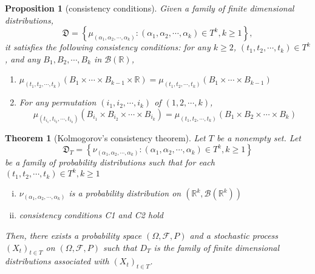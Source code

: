 \documentclass{report}
\newtheorem{proposition}{Proposition}[section]
\newtheorem{theorem}{Theorem}[section]
\theoremstyle{nonumberplain}
\begin{document}
\begin{proposition}[consistency conditions]
	Given a family of finite dimensional distributions,
	$$
	\mathfrak{D}=\left\{\mu_{\left(\alpha_{1}, \alpha_{2}, \cdots, \alpha_{k}\right)}:\left(\alpha_{1}, \alpha_{2}, \cdots, \alpha_{k}\right) \in T^{k}, k\ge1 \right\},
	$$
	it satisfies the following consistency conditions: for any $k\ge2$, $\left(t_{1}, t_{2}, \cdots, t_{k}\right) \in T^k$, and any $B_{1}, B_{2}, \cdots, B_{k}$ in $\mathcal{B}(\mathbb{R})$,
	\begin{enumerate}
		\item[(C1)] $\mu_{\left(t_{1}, t_{2}, \cdots, t_{k}\right)}\left(B_{1} \times \cdots \times B_{k-1} \times \mathbb{R}\right)=\mu_{\left(t_{1}, t_{2}, \cdots, t_{k}\right)}\left(B_{1} \times \cdots \times B_{k-1}\right)$
		\item[(C2)] For any permutation $\left(i_{1}, i_{2}, \cdots, i_{k}\right)$ of $(1,2, \cdots, k)$,
		\[
		\mu_{\left(t_{i_{1}}, t_{i_{2}}, \cdots, t_{i_{k}}\right)}\left(B_{i_{1}} \times B_{i_{2}} \times \cdots \times B_{i_{k}}\right)=\mu_{\left(t_{1}, t_{2}, \cdots, t_{k}\right)}\left(B_{1} \times B_{2} \times \cdots \times B_{k}\right)
		\]
	\end{enumerate}
\end{proposition}

\begin{theorem}[Kolmogorov's consistency theorem]
	Let $T$ be a nonempty set. Let 
	$$
	\mathfrak{D}_{T} =\left\{\nu_{\left(\alpha_{1}, \alpha_{2}, \cdots, \alpha_{k}\right)}:\left(\alpha_{1}, \alpha_{2}, \cdots, \alpha_{k}\right) \in T^{k}, k\ge1 \right\}
	$$
	be a family of probability distributions such that for each $\left(t_{1}, t_{2}, \cdots, t_{k}\right) \in T^k,k\ge1$
	\begin{enumerate}[(i)]
		\item $\nu_{\left(\alpha_{1}, \alpha_{2}, \cdots, \alpha_{k}\right)}$ is a probability distribution on $\left(\mathbb{R}^{k}, \mathcal{B}\left(\mathbb{R}^{k}\right)\right)$
		\item consistency conditions C1 and C2 hold
	\end{enumerate}
	Then, there exists a probability space $(\Omega, \mathcal{F}, P)$ and a stochastic process $(X_t)_{t\in T}$ on $(\Omega, \mathcal{F}, P)$ such that $D_{T}$ is the family of finite dimensional distributions associated with $(X_t)_{t\in T}$.
\end{theorem}
\end{document}
